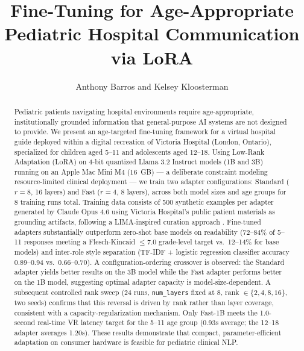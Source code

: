 \documentclass[journal]{IEEEtai}
\begin{document}
\title{Fine-Tuning for Age-Appropriate Pediatric Hospital Communication via LoRA}


\author{Anthony Barros and Kelsey Kloosterman}

\maketitle

\begin{abstract}
Pediatric patients navigating hospital environments require age-appropriate, institutionally grounded information that general-purpose AI systems are not designed to provide. We present an age-targeted fine-tuning framework for a virtual hospital guide deployed within a digital recreation of Victoria Hospital (London, Ontario), specialized for children aged 5--11 and adolescents aged 12--18. Using Low-Rank Adaptation (LoRA) on 4-bit quantized Llama 3.2 Instruct models (1B and 3B) running on an Apple Mac Mini M4 (16~GB) --- a deliberate constraint modeling resource-limited clinical deployment --- we train two adapter configurations: Standard ($r=8$, 16 layers) and Fast ($r=4$, 8 layers), across both model sizes and age groups for 8 training runs total. Training data consists of 500 synthetic examples per adapter generated by Claude Opus 4.6 using Victoria Hospital's public patient materials as grounding artifacts, following a LIMA-inspired curation approach \cite{zhou2023lima}. Fine-tuned adapters substantially outperform zero-shot base models on readability (72--84\% of 5--11 responses meeting a Flesch-Kincaid $\leq 7.0$ grade-level target vs.\ 12--14\% for base models) and inter-role style separation (TF-IDF + logistic regression classifier accuracy 0.89--0.94 vs.\ 0.66--0.70). A configuration-ordering crossover is observed: the Standard adapter yields better results on the 3B model while the Fast adapter performs better on the 1B model, suggesting optimal adapter capacity is model-size-dependent. A subsequent controlled rank sweep (24 runs, \texttt{num\_layers} fixed at 8, rank $\in \{2,4,8,16\}$, two seeds) confirms that this reversal is driven by rank rather than layer coverage, consistent with a capacity-regularization mechanism. Only Fast-1B meets the 1.0-second real-time VR latency target for the 5--11 age group (0.93s average; the 12--18 adapter averages 1.20s). These results demonstrate that compact, parameter-efficient adaptation on consumer hardware is feasible for pediatric clinical NLP.
\end{abstract}
\end{document}
